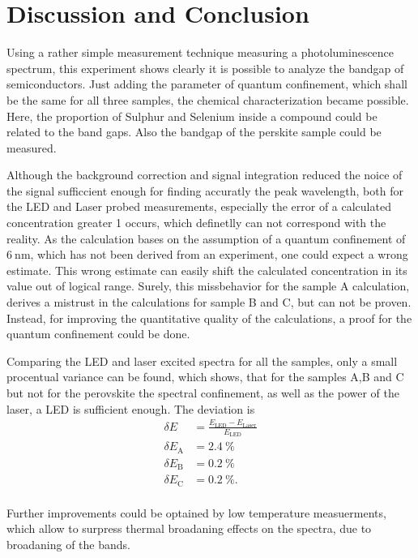 \section{Discussion and Conclusion}
\label{sec:Discussion}


Using a rather simple measurement technique measuring a photoluminescence spectrum, this experiment shows clearly it is possible to analyze the bandgap of semiconductors.
Just adding the parameter of quantum confinement, which shall be the same for all three samples, the chemical characterization became possible.
Here, the proportion of Sulphur and Selenium inside a compound could be related to the band gaps. 
Also the bandgap of the perskite sample could be measured.

Although the background correction and signal integration reduced the noice of the signal sufficcient enough for finding accuratly the peak wavelength, both for the LED and Laser probed measurements,
especially the error of a calculated concentration greater 1 occurs, which definetlly can not correspond with the reality.
As the calculation bases on the assumption of a quantum confinement of $\SI{6}{\nano\meter}$, which has not been derived from an experiment, one could expect a wrong estimate.
This wrong estimate can easily shift the calculated concentration in its value out of logical range.
Surely, this missbehavior for the sample A calculation, derives a mistrust in the calculations for sample B and C, but can not be proven.
Instead, for improving the quantitative quality of the calculations, a proof for the quantum confinement could be done.

Comparing the LED and laser excited spectra for all the samples, only a small procentual variance can be found, which shows, that for the samples A,B and C but not for the perovskite the spectral confinement, as well as the power of the laser, a LED is sufficient enough.
The deviation is 
\begin{align*}
    \delta E &= \frac{E_\text{LED} - E_\text{Laser}}{E_\text{LED}} \\
    \delta E_\text{A} &= \SI{2.4}{\percent} \\
    \delta E_\text{B} &= \SI{0.2}{\percent} \\
    \delta E_\text{C} &= \SI{0.2}{\percent}. \\
\end{align*}

Further improvements could be optained by low temperature measuerments, which allow to surpress thermal broadaning effects on the spectra, due to broadaning of the bands.
